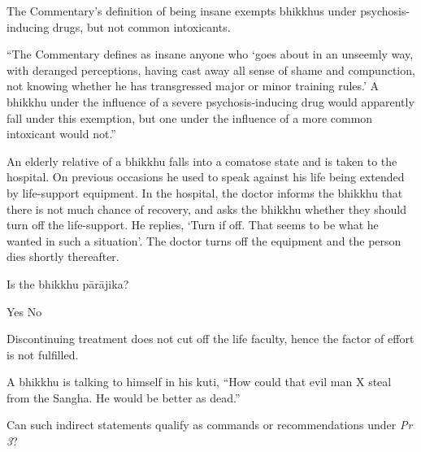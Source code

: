 \begin{exam}{\autoExamName}
\begin{problem}
\begin{solution}
    The Commentary's definition of being insane exempts bhikkhus under psychosis-inducing drugs, but not common intoxicants.

    ``The Commentary defines as insane anyone who `goes about in an unseemly way, with deranged perceptions, having cast away all sense of shame and compunction, not knowing whether he has transgressed major or minor training rules.'
    A bhikkhu under the influence of a severe psychosis-inducing drug would apparently fall under this exemption, but one under the influence of a more common intoxicant would not.''

  \end{solution}

\end{problem}

\problemDivide

\begin{problem}

  An elderly relative of a bhikkhu falls into a comatose state and is taken to the hospital.
  On previous occasions he used to speak against his life being extended by life-support equipment.
  In the hospital, the doctor informs the bhikkhu that there is not much chance of recovery, and asks the bhikkhu whether they should turn off the life-support.
  He replies, `Turn if off. That seems to be what he wanted in such a situation'.
  The doctor turns off the equipment and the person dies shortly thereafter.

  \bigskip

  Is the bhikkhu pārājika?

  \begin{answers}{2}
    \bChoices
     Yes\eAns
     No\eAns
    \eChoices
  \end{answers}

  \begin{solution}
    Discontinuing treatment does not cut off the life faculty, hence the factor of effort is not fulfilled.
  \end{solution}

\end{problem}

\ifnosolutions
\problemDivide
\else
\clearpage
\fi

\begin{problem}

  A bhikkhu is talking to himself in his kuti, ``How could that evil man X steal from the Sangha. He would be better as dead.''

  Can such indirect statements qualify as commands or recommendations under \emph{Pr 3}?


\end{problem}
\end{exam}
